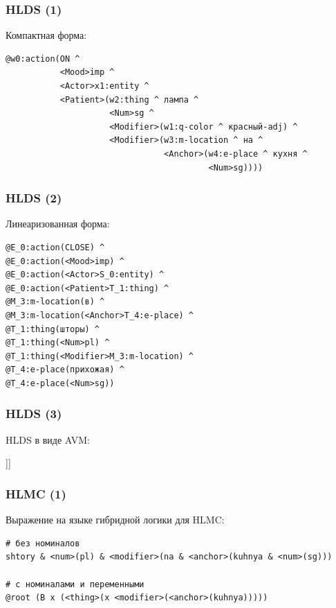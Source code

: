\documentclass{beamer}
\begin{document}
\begin{frame}[fragile]
\frametitle{HLDS (1)}
Компактная форма:
{\footnotesize \begin{verbatim}
@w0:action(ON ^
           <Mood>imp ^
           <Actor>x1:entity ^
           <Patient>(w2:thing ^ лампа ^
                     <Num>sg ^
                     <Modifier>(w1:q-color ^ красный-adj) ^
                     <Modifier>(w3:m-location ^ на ^
                                <Anchor>(w4:e-place ^ кухня ^
                                         <Num>sg))))
\end{verbatim}}
\end{frame}

\begin{frame}[fragile]
\frametitle{HLDS (2)}
Линеаризованная форма:
{\footnotesize \begin{verbatim}
@E_0:action(CLOSE) ^ 
@E_0:action(<Mood>imp) ^
@E_0:action(<Actor>S_0:entity) ^ 
@E_0:action(<Patient>T_1:thing) ^ 
@M_3:m-location(в) ^ 
@M_3:m-location(<Anchor>T_4:e-place) ^ 
@T_1:thing(шторы) ^ 
@T_1:thing(<Num>pl) ^ 
@T_1:thing(<Modifier>M_3:m-location) ^ 
@T_4:e-place(прихожая) ^ 
@T_4:e-place(<Num>sg))
\end{verbatim}}
\end{frame}

\begin{frame}[fragile]
\frametitle{HLDS (3)}
HLDS в виде AVM:\\
\begin{center}
	\begin{avm}
	[{action} predicate & on \cr
    	      Mood & imp \cr 
        	  Actor & @{1} \cr 
	          Patient & [{thing} predicate & @{2} лампа \cr
    	                         Num & sg \cr 
        	                     Modifier & [{q-color} predicate & красный\_adj ]]]
	\end{avm}
\end{center}	
\end{frame}

\begin{frame}[fragile]
\frametitle{HLMC (1)}
Выражение на языке гибридной логики для HLMC:
{\footnotesize \begin{verbatim}
# без номиналов
shtory & <num>(pl) & <modifier>(na & <anchor>(kuhnya & <num>(sg)))

# с номиналами и переменными
@root (B x (<thing>(x <modifier>(<anchor>(kuhnya)))))
\end{verbatim}}
\end{frame}
\end{document}
